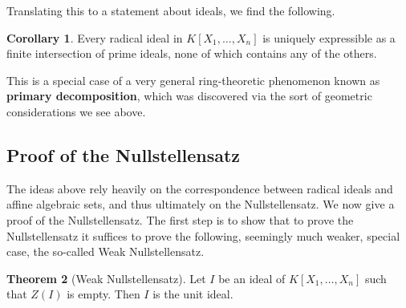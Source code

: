 \documentclass{article}
\newcommand{\rb}[1]{\left( #1 \right)}
\renewcommand{\sb}[1]{\left[ #1 \right]}
\theoremstyle{definition}\newtheorem{definition}{Definition}[subsection]
\theoremstyle{definition}\newtheorem{remark}[definition]{Remark}
\theoremstyle{definition}\newtheorem*{example}{Example}
\theoremstyle{definition}\newtheorem*{note}{Note}
\newtheorem{theorem}[definition]{Theorem}
\newtheorem{corollary}[definition]{Corollary}
\begin{document}
Translating this to a statement about ideals, we find the following.

\begin{corollary}
Every radical ideal in $ K\sb{X_1, \dots, X_n} $ is uniquely expressible as a finite intersection of prime ideals, none of which contains any of the others.
\end{corollary}

This is a special case of a very general ring-theoretic phenomenon known as \textbf{primary decomposition}, which was discovered via the sort of geometric considerations we see above.

\pagebreak

\subsection{Proof of the Nullstellensatz}

The ideas above rely heavily on the correspondence between radical ideals and affine algebraic sets, and thus ultimately on the Nullstellensatz. We now give a proof of the Nullstellensatz. The first step is to show that to prove the Nullstellensatz it suffices to prove the following, seemingly much weaker, special case, the so-called Weak Nullstellensatz.

\begin{theorem}[Weak Nullstellensatz]
\label{thm:13.3.1}
Let $ I $ be an ideal of $ K\sb{X_1, \dots, X_n} $ such that $ Z\rb{I} $ is empty. Then $ I $ is the unit ideal.
\end{theorem}
\end{document}
